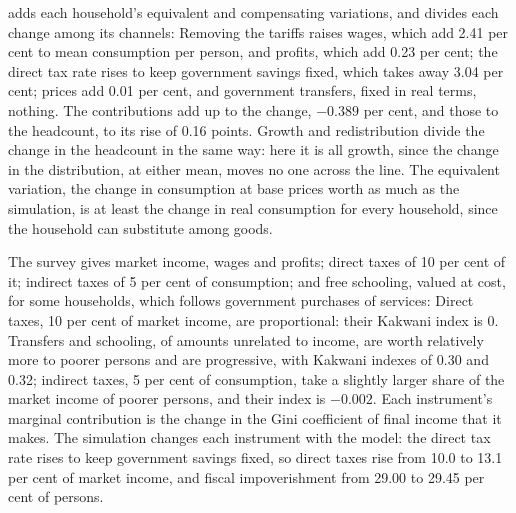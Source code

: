 
 adds each household's equivalent and compensating variations,
and  divides each change among its channels:
Removing the tariffs raises wages, which add 2.41 per cent to mean
consumption per person, and profits, which add 0.23 per cent; the direct tax
rate rises to keep government savings fixed, which takes away 3.04 per cent;
prices add 0.01 per cent, and government transfers, fixed in real terms,
nothing. The contributions add up to the change, $-0.389$ per cent, and those
to the headcount, to its rise of 0.16 points. Growth and redistribution divide
the change in the headcount in the same way: here it is all growth, since the
change in the distribution, at either mean, moves no one across the line.
The equivalent variation, the change in consumption at base prices worth as
much as the simulation, is at least the change in real consumption for every
household, since the household can substitute among goods.


The survey gives market income, wages and profits; direct taxes of 10 per
cent of it; indirect taxes of 5 per cent of consumption; and free schooling,
valued at cost, for some households, which follows government purchases of
services:
Direct taxes, 10 per cent of market income, are proportional: their Kakwani
index is 0. Transfers and schooling, of amounts unrelated to income, are worth
relatively more to poorer persons and are progressive, with Kakwani indexes
of 0.30 and 0.32; indirect taxes, 5 per cent of consumption, take a slightly
larger share of the market income of poorer persons, and their index is
$-0.002$. Each instrument's marginal contribution is the change in the Gini
coefficient of final income that it makes. The simulation changes each
instrument with the model: the direct tax rate rises to keep government
savings fixed, so direct taxes rise from 10.0 to 13.1 per cent of market
income, and fiscal impoverishment from 29.00 to 29.45 per cent of persons.



